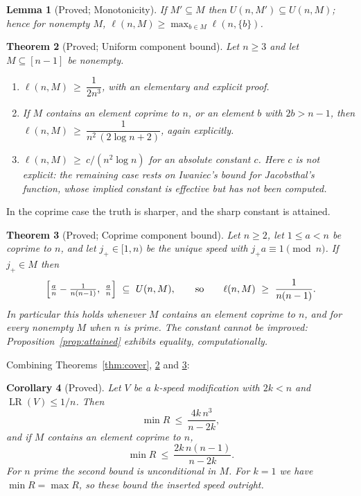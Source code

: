 \documentclass[11pt]{amsart}
\theoremstyle{plain}
\newtheorem{theorem}{Theorem}[section]
\newtheorem{lemma}[theorem]{Lemma}
\newtheorem{corollary}[theorem]{Corollary}
\theoremstyle{definition}
\newcommand{\LR}{\operatorname{LR}}
\begin{document}
\begin{lemma}[Proved; Monotonicity]\label{lem:mono}
If $M'\subseteq M$ then $U(n,M')\subseteq U(n,M)$; hence for nonempty $M$,
$\ell(n,M)\ge\max_{b\in M}\ell(n,\{b\})$.
\end{lemma}

\begin{theorem}[Proved; Uniform component bound]\label{thm:uniform}
Let $n\ge3$ and let $M\subseteq[n-1]$ be nonempty.
\begin{enumerate}
\item[(i)] $\ell(n,M)\ \ge\ \dfrac{1}{2n^{3}}$, with an elementary and explicit proof.
\item[(ii)] If $M$ contains an element coprime to $n$, or an element $b$ with $2b>n-1$, then
  $\ell(n,M)\ \ge\ \dfrac{1}{n^{2}\,(2\log n+2)}$, again explicitly.
\item[(iii)] $\ell(n,M)\ \ge\ c/(n^{2}\log n)$ for an absolute constant $c$. Here $c$ is not
  explicit: the remaining case rests on Iwaniec's bound for Jacobsthal's function, whose implied
  constant is effective but has not been computed.
\end{enumerate}
\end{theorem}

In the coprime case the truth is sharper, and the sharp constant is attained.

\begin{theorem}[Proved; Coprime component bound]\label{thm:unit}
Let $n\ge2$, let $1\le a<n$ be coprime to $n$, and let $j_+\in[1,n)$ be the unique speed with
$j_+a\equiv 1\pmod n$. If $j_+\in M$ then
\[
  \Bigl[\tfrac{a}{n}-\tfrac{1}{n(n-1)},\ \tfrac{a}{n}\Bigr]\ \subseteq\ U(n,M),
  \qquad\text{so}\qquad \ell(n,M)\ \ge\ \frac{1}{n(n-1)} .
\]
In particular this holds whenever $M$ contains an element coprime to $n$, and for every nonempty $M$
when $n$ is prime. The constant cannot be improved: Proposition~\ref{prop:attained} exhibits
equality, computationally.
\end{theorem}

Combining Theorems~\ref{thm:cover}, \ref{thm:uniform} and \ref{thm:unit}:

\begin{corollary}[Proved]\label{cor:main}
Let $V$ be a $k$-speed modification with $2k<n$ and $\LR(V)\le 1/n$. Then
\[
  \min R\ \le\ \frac{4k\,n^{3}}{n-2k},
\]
and if $M$ contains an element coprime to $n$,
\[
  \min R\ \le\ \frac{2k\,n(n-1)}{n-2k}.
\]
For $n$ prime the second bound is unconditional in $M$. For $k=1$ we have $\min R=\max R$, so these
bound the inserted speed outright.
\end{corollary}
\end{document}
